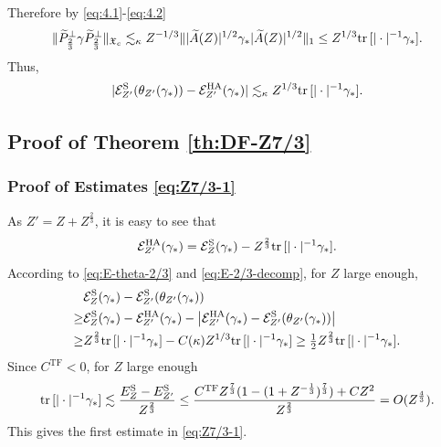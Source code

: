 \documentclass[a4paper]{amsart}
\def\tr{{\rm tr \,}}
\def\cE{{\mathcal E}}
\def\gX{\mathfrak{X}}
\begin{document}
Therefore by \eqref{eq:4.1}-\eqref{eq:4.2}
\begin{equation}
  \|\widetilde{P}_{\frac23}^\perp\gamma \widetilde{P}_{\frac23}^\perp\|_{\gX_c}\lesssim_{\kappa} Z^{-1/3}\||\widetilde{A}(Z)|^{1/2}\gamma_* |\widetilde{A}(Z)|^{1/2}\|_1\leq  Z^{1/3}\tr[|\cdot|^{-1}\gamma_*].
\end{equation}
Thus,
\begin{equation}\label{eq:E-theta-2/3}
    |\cE_{Z'}^{\rm S}(\theta_{Z'}(\gamma_*))-\mathcal{E}_{Z'}^{\rm HA}(\gamma_*)|\lesssim_\kappa Z^{1/3}\tr[|\cdot|^{-1}\gamma_*].
\end{equation}


\subsection{Proof of Theorem \ref{th:DF-Z7/3}}

\subsubsection{Proof of Estimates \eqref{eq:Z7/3-1}}
As $Z'=Z+Z^{\frac23}$, it is easy to see that 
\begin{equation}\label{eq:E-2/3-decomp}
  \cE_{Z'}^{\rm HA}(\gamma_*)= \cE_{Z}^{\rm S}(\gamma_*) -Z^{\frac23}\tr[|\cdot|^{-1}\gamma_*].
\end{equation}
According to \eqref{eq:E-theta-2/3} and \eqref{eq:E-2/3-decomp}, for
$Z$ large enough,
\begin{equation}
  \begin{split}
    &  \cE_{Z}^{\rm S}(\gamma_*)-\cE_{Z'}^{\rm S}(\theta_{Z'}(\gamma_*))\\
    \geq & \cE_{Z}^{\rm S}(\gamma_*)-\cE_{Z'}^{\rm HA}(\gamma_*)-\left|\cE_{Z'}^{\rm HA}(\gamma_*) -\cE_{Z'}^{\rm S}(\theta_{Z'}(\gamma_*))\right|\\
    \geq &Z^{\frac23}\tr[|\cdot|^{-1}\gamma_*]-C(\kappa) Z^{1/3}\tr[|\cdot|^{-1}\gamma_*]\geq \tfrac{1}{2}Z^{\frac23}\tr[|\cdot|^{-1}\gamma_*].
  \end{split}
\end{equation}
Since $C^\mathrm{TF}<0$, for $Z$ large enough
\begin{equation}\label{eq:coulomb}
  \tr[|\cdot|^{-1}\gamma_*]\lesssim \frac{E_Z^{\rm S}-E_{Z'}^{\rm S}}{Z^{\frac23}}
  \leq \frac{C^\mathrm{TF}Z^\frac73(1-(1+Z^{-\frac13})^\frac73)+CZ^2}{Z^{\frac23}}= O(Z^\frac43). 
\end{equation}
This gives the first estimate in \eqref{eq:Z7/3-1}.
\end{document}
